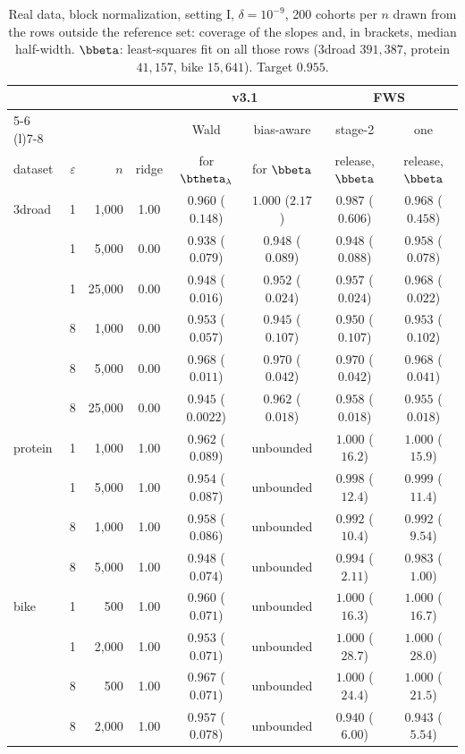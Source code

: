\begin{table}[t]
  \centering
  \small
  \caption{Real data, block normalization, setting I, $\delta = 10^{-9}$, 200 cohorts per $n$ drawn from the rows outside the reference set: coverage of the slopes and, in brackets, median half-width. $\bbeta$: least-squares fit on all those rows (3droad $391{,}387$, protein $41{,}157$, bike $15{,}641$). Target $0.955$.}
  \label{tab:fws_real}
  \footnotesize
  \setlength{\tabcolsep}{3pt}
  \begin{tabular}{@{}lrrccccc@{}}
    \toprule
    & & & & \multicolumn{2}{c}{v3.1} & \multicolumn{2}{c}{FWS} \\
    \cmidrule(lr){5-6} \cmidrule(l){7-8}
    & & & & Wald & bias-aware & stage-2 & one \\
    dataset & $\varepsilon$ & $n$ & ridge & for $\btheta_\lambda$ & for $\bbeta$ & release, $\bbeta$ & release, $\bbeta$ \\
    \midrule
    3droad & 1 & 1{,}000 & 1.00 & $0.960$ ($0.148$) & $1.000$ ($2.17$) & $0.987$ ($0.606$) & $0.968$ ($0.458$) \\
     & 1 & 5{,}000 & 0.00 & $0.938$ ($0.079$) & $0.948$ ($0.089$) & $0.948$ ($0.088$) & $0.958$ ($0.078$) \\
     & 1 & 25{,}000 & 0.00 & $0.948$ ($0.016$) & $0.952$ ($0.024$) & $0.957$ ($0.024$) & $0.968$ ($0.022$) \\
     & 8 & 1{,}000 & 0.00 & $0.953$ ($0.057$) & $0.945$ ($0.107$) & $0.950$ ($0.107$) & $0.953$ ($0.102$) \\
     & 8 & 5{,}000 & 0.00 & $0.968$ ($0.011$) & $0.970$ ($0.042$) & $0.970$ ($0.042$) & $0.968$ ($0.041$) \\
     & 8 & 25{,}000 & 0.00 & $0.945$ ($0.0022$) & $0.962$ ($0.018$) & $0.958$ ($0.018$) & $0.955$ ($0.018$) \\
    \addlinespace
    protein & 1 & 1{,}000 & 1.00 & $0.962$ ($0.089$) & unbounded & $1.000$ ($16.2$) & $1.000$ ($15.9$) \\
     & 1 & 5{,}000 & 1.00 & $0.954$ ($0.087$) & unbounded & $0.998$ ($12.4$) & $0.999$ ($11.4$) \\
     & 8 & 1{,}000 & 1.00 & $0.958$ ($0.086$) & unbounded & $0.992$ ($10.4$) & $0.992$ ($9.54$) \\
     & 8 & 5{,}000 & 1.00 & $0.948$ ($0.074$) & unbounded & $0.994$ ($2.11$) & $0.983$ ($1.00$) \\
    \addlinespace
    bike & 1 & 500 & 1.00 & $0.960$ ($0.071$) & unbounded & $1.000$ ($16.3$) & $1.000$ ($16.7$) \\
     & 1 & 2{,}000 & 1.00 & $0.953$ ($0.071$) & unbounded & $1.000$ ($28.7$) & $1.000$ ($28.0$) \\
     & 8 & 500 & 1.00 & $0.967$ ($0.071$) & unbounded & $1.000$ ($24.4$) & $1.000$ ($21.5$) \\
     & 8 & 2{,}000 & 1.00 & $0.957$ ($0.078$) & unbounded & $0.940$ ($6.00$) & $0.943$ ($5.54$) \\
    \bottomrule
  \end{tabular}
\end{table}

